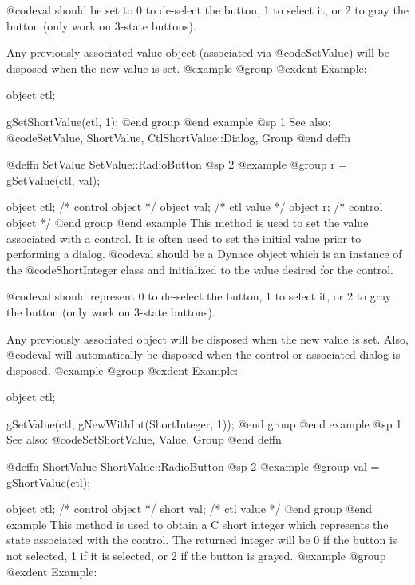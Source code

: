 @code{val} should be set to 0 to de-select the button, 1 to select it, or 2 to
gray the button (only work on 3-state buttons).

Any previously associated value object (associated via @code{SetValue})
will be disposed when the new value is set.
@example
@group
@exdent Example:

object  ctl;

gSetShortValue(ctl, 1);
@end group
@end example
@sp 1
See also:  @code{SetValue, ShortValue, CtlShortValue::Dialog, Group}
@end deffn
















@deffn {SetValue} SetValue::RadioButton
@sp 2
@example
@group
r = gSetValue(ctl, val);

object  ctl;    /*  control object  */
object  val;    /*  ctl value       */
object  r;      /*  control object  */
@end group
@end example
This method is used to set the value associated with a control.  It is
often used to set the initial value prior to performing a dialog.
@code{val} should be a Dynace object which is an instance of the
@code{ShortInteger} class and initialized to the value desired for the
control.

@code{val} should represent 0 to de-select the button, 1 to select it, or 2 to
gray the button (only work on 3-state buttons).

Any previously associated object will be disposed when the new value is set.
Also, @code{val} will automatically be disposed when the control or associated
dialog is disposed.
@example
@group
@exdent Example:

object  ctl;

gSetValue(ctl, gNewWithInt(ShortInteger, 1));
@end group
@end example
@sp 1
See also:  @code{SetShortValue, Value, Group}
@end deffn













@deffn {ShortValue} ShortValue::RadioButton
@sp 2
@example
@group
val = gShortValue(ctl);

object  ctl;   /*  control object  */
short   val;   /*  ctl value       */
@end group
@end example
This method is used to obtain a C short integer which represents the
state associated with the control.  The returned integer will be 0 if
the button is not selected, 1 if it is selected, or 2 if the button is grayed.
@example
@group
@exdent Example:

